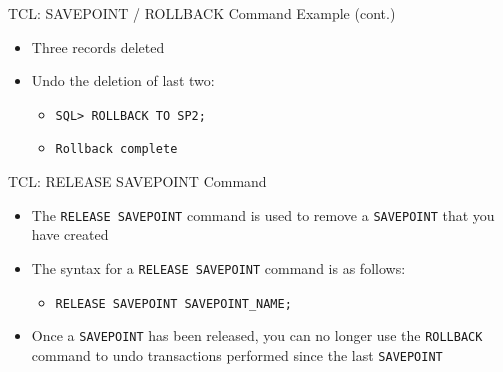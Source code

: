 \documentclass[aspectratio=169, xcolor=dvipsnames]{beamer}
\begin{document}
\begin{frame}[fragile]{TCL: SAVEPOINT / ROLLBACK Command Example (cont.)}
    \begin{itemize}[<+->]
        \item Three records deleted
        \item Undo the deletion of last two:
        \begin{itemize}
            \item \texttt{SQL> ROLLBACK TO SP2;}
            \item \texttt{Rollback complete}
        \end{itemize}
    \end{itemize}
    \vspace{0.5em}
\end{frame}

\begin{frame}{TCL: RELEASE SAVEPOINT Command}
    \begin{itemize}[<+->]
        \item The \texttt{RELEASE SAVEPOINT} command is used to remove a \texttt{SAVEPOINT} that you have created
        \item The syntax for a \texttt{RELEASE SAVEPOINT} command is as follows:
        \begin{itemize}
            \item \texttt{RELEASE SAVEPOINT SAVEPOINT\_NAME;}
        \end{itemize}
        \item Once a \texttt{SAVEPOINT} has been released, you can no longer use the \texttt{ROLLBACK} command to undo transactions performed since the last \texttt{SAVEPOINT}
    \end{itemize}
\end{frame}
\end{document}

